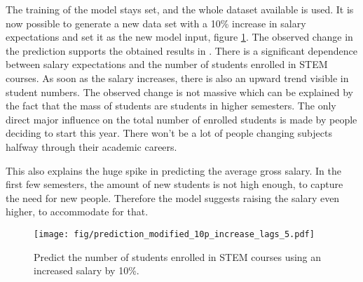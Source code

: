 \documentclass{article}
\theoremstyle{plain}
\theoremstyle{definition}
\theoremstyle{remark}
\begin{document}
The training of the model stays set, and the whole dataset available is used. It is now possible to 
generate a new data set with a 10\% increase in salary expectations and set it as the new model input, figure \ref{fig:altered salary}.
The observed change in the prediction supports the obtained results in . There is a significant
dependence between salary expectations and the number of students enrolled in STEM courses. As soon as the salary
increases, there is also an upward trend visible in student numbers. The observed change is not massive which can be explained
by the fact that the mass of students are students in higher semesters. The only direct major influence on
the total number of enrolled students is made by people deciding to start this year. There won't be a lot of people changing subjects
halfway through their academic careers.

This also explains the huge spike in predicting the average gross salary. In the first few semesters,
the amount of new students is not high enough, to capture the need for new people. Therefore the model suggests raising the
salary even higher, to accommodate for that.

\begin{figure}[H]
    \centering
    \texttt{[image: fig/prediction\_modified\_10p\_increase\_lags\_5.pdf]}
    \caption{Predict the number of students enrolled in STEM courses using an increased salary by 10\%.}
    \label{fig:altered salary}
\end{figure}






\end{document}
